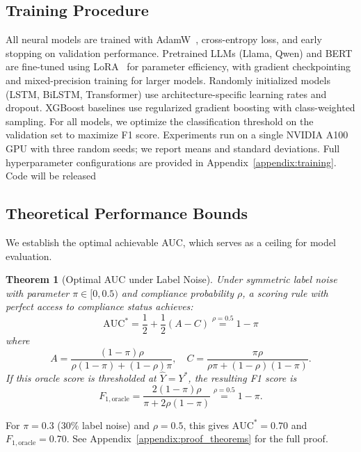 \documentclass{article}
\theoremstyle{plain}
\newtheorem{theorem}{Theorem}[section]
\theoremstyle{definition}
\theoremstyle{remark}
\begin{document}
\subsection{Training Procedure}
\label{subsec:training}

All neural models are trained with AdamW~\citep{AdamW}, cross-entropy loss, and early stopping on validation performance. Pretrained LLMs (Llama, Qwen) and BERT are fine-tuned using LoRA~\citep{LoRA} for parameter efficiency, with gradient checkpointing and mixed-precision training for larger models. Randomly initialized models (LSTM, BiLSTM, Transformer) use architecture-specific learning rates and dropout. XGBoost baselines use regularized gradient boosting with class-weighted sampling. For all models, we optimize the classification threshold on the validation set to maximize F1 score. Experiments run on a single NVIDIA A100 GPU with three random seeds; we report means and standard deviations. Full hyperparameter configurations are provided in Appendix~\ref{appendix:training}. Code will be released 

\subsection{Theoretical Performance Bounds}
\label{sec:theoretical_bounds}

We establish the optimal achievable AUC, which serves as a ceiling for model evaluation.

\begin{theorem}[Optimal AUC under Label Noise]
\label{thm:optimal_performance}
Under symmetric label noise with parameter $\pi \in [0, 0.5)$ and compliance probability $\rho$, a scoring rule with perfect access to compliance status achieves:
\[
\mathrm{AUC}^* = \frac{1}{2} + \frac{1}{2}(A - C) \overset{\rho=0.5}{=} 1 - \pi
\]
where
\[
A = \frac{(1-\pi)\rho}{\rho(1-\pi) + (1-\rho)\pi}, \quad C = \frac{\pi\rho}{\rho\pi + (1-\rho)(1-\pi)}.
\]
If this oracle score is thresholded at $\widehat{Y}=Y^{*}$, the resulting F1 score is
\[
F_{1,\mathrm{oracle}} = \frac{2(1-\pi)\rho}{\pi + 2\rho(1-\pi)} \overset{\rho=0.5}{=} 1-\pi.
\]
\end{theorem}

For $\pi = 0.3$ (30\% label noise) and $\rho = 0.5$, this gives $\mathrm{AUC}^* = 0.70$ and $F_{1,\mathrm{oracle}} = 0.70$. See Appendix~\ref{appendix:proof_theorems} for the full proof.
\end{document}
